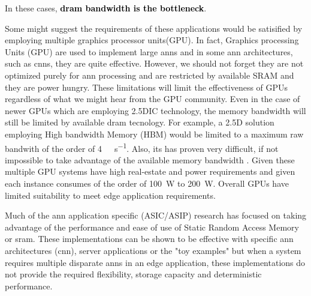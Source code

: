 In these cases, \textbf{\textcolor{black}{\ac{dram} bandwidth is the bottleneck}}.
\fi



\iffalse
So considering the performance improvements observed in other applications, it is expected that many customer facing or edge applications will implement multiple instances of artificial neural networks to perform various functions.
have very large memory and processing requirements.
require multiple instances of \ac{ann}s of similar size to the \ac{ann} described in \cite{krizhevsky2012imagenet}.

For example employing multiple cameras or monitoring and controlling different systems in a drone, a automobile each with an image recognition \ac{ann}\cite{krizhevsky2012imagenet}\cite{bojarski2016end} for navigation, engine monitoring along with other system control.
\fi

\iffalse
Some might suggest the requirements of these applications would be satisified by employing multiple graphics processor units(GPU).
In fact, Graphics processing Units (GPU) are used to implement large \ac{ann}s and in some \ac{ann} architectures, such as \acp{cnn}, they are quite effective. However, we should not forget they are not optimized purely for \ac{ann} processing and are restricted by available SRAM and they are power hungry. These limitations will limit the effectiveness of GPUs regardless of what we might hear from the GPU community.
Even in the case of newer GPUs which are employing 2.5DIC technology, the memory bandwidth will still be limited by available \ac{dram} tecnology.
For example, a 2.5D solution employing High bandwidth Memory (HBM) would be limited to a maximum raw bandwith of the order of \SI[per-mode=symbol]{4}{\tera \bit \per \second}.
Also, its has proven very difficult, if not impossible to take advantage of the available memory bandwidth \cite{farabet2011neuflow} \cite{tensorflow2015-whitepaper}.
Given these multiple GPU systems have high real-estate and power requirements and given each instance consumes of the order of \SI{100}{\watt} to \SI{200}{\watt}.
Overall GPUs have limited suitability to meet edge application requirements.


Much of the \ac{ann} application specific (ASIC/ASIP) research has focused on taking advantage of the performance and ease of use of Static Random Access Memory or \ac{sram}. 
These implementations can be shown to be effective with specific \ac{ann} architectures (\ac{cnn}), server applications or the "toy examples" but when a system requires multiple disparate \ac{ann}s in an edge application, these implementations do not provide the required flexibility, storage capacity and deterministic performance.


